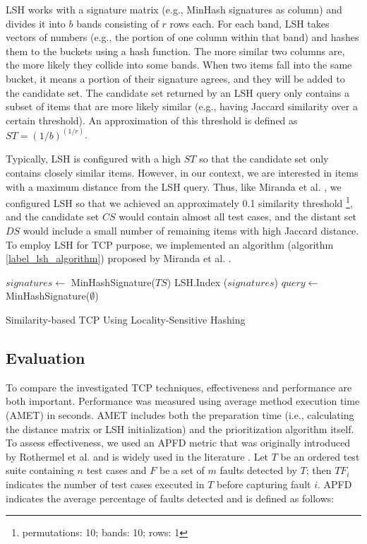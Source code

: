 \documentclass[runningheads]{llncs}
\begin{document}
LSH works with a signature matrix (e.g., MinHash signatures as column) and divides it into $b$ bands consisting of $r$ rows each. For each band, LSH takes vectors of numbers (e.g., the portion of one column within that band) and hashes them to the buckets using a hash function. The more similar two columns are, the more likely they collide into some bands. When two items fall into the same bucket, it means a portion of their signature agrees, and they will be added to the candidate set. The candidate set returned by an LSH query only contains a subset of items that are more likely similar (e.g., having Jaccard similarity over a certain threshold). An approximation of this threshold is defined as $ST = (1/b)^{(1/r)}$. 

Typically, LSH is configured with a high $ST$ so that the candidate set only contains closely similar items. However, in our context, we are interested in items with a maximum distance from the LSH query. Thus, like Miranda et al. \cite{miranda2018fast}, we configured LSH so that we achieved an approximately 0.1 similarity threshold \footnote{permutations: 10; bands: 10; rows: 1}, and the candidate set $CS$ would contain almost all test cases, and the distant set $DS$ would include a small number of remaining items with high Jaccard distance. To employ LSH for TCP purpose, we implemented an algorithm (algorithm \ref{label_lsh_algorithm}) proposed by Miranda et al. \cite{miranda2018fast}.

\begin{algorithm}[h]
\label{label_lsh_algorithm}
\SetAlgoLined
{}
$signatures \leftarrow$ MinHashSignature($TS$)\;
LSH.Index ($signatures$)\;
$query \leftarrow$ MinHashSignature($\emptyset$)\;
 \caption{Similarity-based TCP Using Locality-Sensitive Hashing}
\end{algorithm}


\subsection{Evaluation}
\label{label_evaluation}
To compare the investigated TCP techniques, effectiveness and performance are both important. Performance was measured using average method execution time (AMET) in seconds. AMET includes both the preparation time (i.e., calculating the distance matrix or LSH initialization) and the prioritization algorithm itself. To assess effectiveness, we used an APFD metric that was originally introduced by Rothermel et al. \cite{rothermel2001prioritizing} and is widely used in the literature \cite{khatibsyarbini2017test}. Let $T$ be an ordered test suite containing $n$ test cases and $F$ be a set of $m$ faults detected by $T$; then $TF_{i}$ indicates the number of test cases executed in $T$ before capturing fault $i$. APFD indicates the average percentage of faults detected and is defined as follows:
\end{document}
